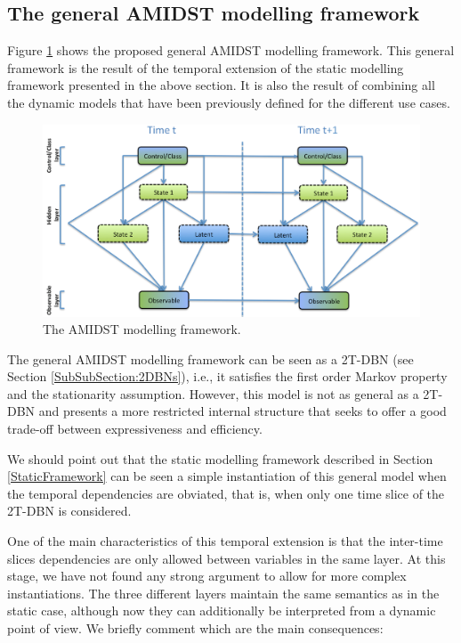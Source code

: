 \subsection{The general AMIDST modelling framework}\label{GeneralModelClass}

Figure \ref{Figure:AMIDSTModelClass} shows the proposed general AMIDST modelling framework. This general framework is the result of the temporal extension of the static modelling framework presented in the above section. It is also the result of combining all the dynamic models that have been previously defined for the different use cases. 

\begin{figure}[ht!]
\begin{center}
\includegraphics[scale=0.465]{./figures/AMIDSTModelClass}
\caption{\label{Figure:AMIDSTModelClass} The AMIDST modelling framework.}
\end{center}
\end{figure}

The general AMIDST modelling framework can be seen as a 2T-DBN (see Section \ref{SubSubSection:2DBNs}), i.e., it satisfies the first order Markov property and the stationarity assumption. However, this model is not as general as a 2T-DBN and presents a more restricted internal structure that seeks to offer a good trade-off between expressiveness and efficiency. 

We should point out that the static modelling framework described in Section \ref{StaticFramework} can be seen a simple instantiation of this general model when the temporal dependencies are obviated, that is, when only one time slice of the 2T-DBN is considered. 

One of the main characteristics of this temporal extension is that the inter-time slices dependencies are only allowed between variables in the same layer. At this stage, we have not found any strong argument to allow for more complex instantiations. The three different layers maintain the same semantics as in the static case, although now they can additionally be interpreted from a dynamic point of view. We briefly comment which are the main consequences: 

